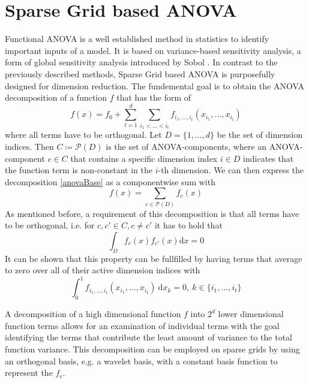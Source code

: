 \documentclass[
  a4paper,  %
  twoside,  %
  bibliography=totoc,
  headsepline,
  cleardoublepage=empty,
  parskip=half,
  draft=false
]{scrbook}
\begin{document}
\section{Sparse Grid based ANOVA}

Functional ANOVA is a well established method in statistics to identify important inputs of a model.
It is based on variance-based sensitivity analysis, a form of global sensitivity analysis introduced by Sobol \cite{S01}.
In contrast to the previously described methods, Sparse Grid based ANOVA is purposefully designed for dimension reduction.
The fundemental goal is to obtain the ANOVA decomposition of a function $f$ that has the form of
\begin{equation}
f(x)=f_0 + \sum_{t=1}^d \sum_{i_1 < \dots < i_t} f_{i_1,\dots,i_t}(x_{i_1},\dots,x_{i_t})
\label{anovaBase}
\end{equation}
where all terms have to be orthogonal.
Let $D=\{1,\dots,d\}$ be the set of dimension indices.
Then $C \coloneqq \mathcal{P}(D)$ is the set of ANOVA-components, where an ANOVA-component $c \in C$ that contains a specific dimension index $i \in D$ indicates that the function term is non-constant in the $i$-th dimension.
We can then express the decomposition \eqref{anovaBase} as a componentwise sum with
\begin{equation}
f(x)=\sum_{c \in \mathcal{P}(D)} f_{c}(x)
\label{anovaComp}
\end{equation}
As mentioned before, a requirement of this decomposition is that all terms have to be orthogonal, i.e. for $c,c' \in C, c \neq c'$ it has to hold that
\begin{equation}
\int_{\Omega} f_c(x) f_{c'}(x) \text{d}x = 0
\end{equation}
It can be shown that this property can be fullfilled by having terms that average to zero over all of their active dimension indices with
\begin{equation}
\int_0^1 f_{i_1,\dots,i_t}(x_{i_1},\dots,x_{i_t}) ~ \text{d}x_k = 0, ~ k \in \{i_1, \dots, i_t\}
\end{equation}



A decomposition of a high dimensional function $f$ into $2^d$ lower dimensional function terms allows for an examination of individual terms with the goal identifying the terms that contribute the least amount of variance to the total function variance.
This decomposition can be employed on sparse grids by using an orthogonal basis, e.g. a wavelet basis, with a constant basis function to represent the $f_c$.
\end{document}
